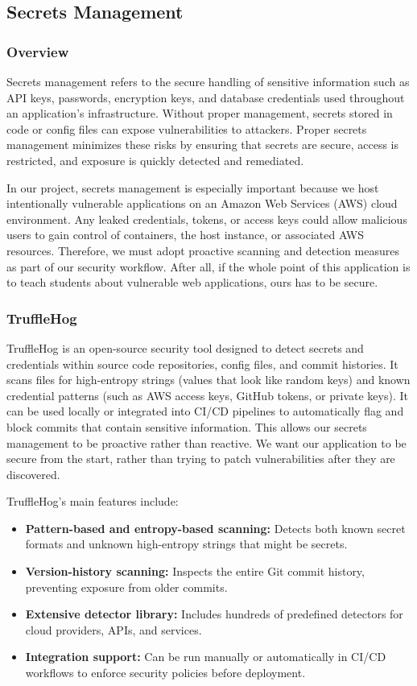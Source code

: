 \documentclass[12pt]{article}
\begin{document}
\subsection{Secrets Management}

\subsubsection{Overview}
Secrets management refers to the secure handling of sensitive information such as API keys, passwords, encryption keys, and database credentials used throughout an application's infrastructure. Without proper management, secrets stored in code or config files can expose vulnerabilities to attackers. Proper secrets management minimizes these risks by ensuring that secrets are secure, access is restricted, and exposure is quickly detected and remediated. 

In our project, secrets management is especially important because we host intentionally vulnerable applications on an Amazon Web Services (AWS) cloud environment. Any leaked credentials, tokens, or access keys could allow malicious users to gain control of containers, the host instance, or associated AWS resources. Therefore, we must adopt proactive scanning and detection measures as part of our security workflow. After all, if the whole point of this application is to teach students about vulnerable web applications, ours has to be secure.

\subsubsection{TruffleHog}
TruffleHog is an open-source security tool designed to detect secrets and credentials within source code repositories, config files, and commit histories. It scans files for high-entropy strings (values that look like random keys) and known credential patterns (such as AWS access keys, GitHub tokens, or private keys). It can be used locally or integrated into CI/CD pipelines to automatically flag and block commits that contain sensitive information. This allows our secrets management to be proactive rather than reactive. We want our application to be secure from the start, rather than trying to patch vulnerabilities after they are discovered. 

TruffleHog’s main features include:
\begin{itemize}
    \item \textbf{Pattern-based and entropy-based scanning:} Detects both known secret formats and unknown high-entropy strings that might be secrets. 
    \item \textbf{Version-history scanning:} Inspects the entire Git commit history, preventing exposure from older commits.
    \item \textbf{Extensive detector library:} Includes hundreds of predefined detectors for cloud providers, APIs, and services.
    \item \textbf{Integration support:} Can be run manually or automatically in CI/CD workflows to enforce security policies before deployment.
\end{itemize}
\end{document}
